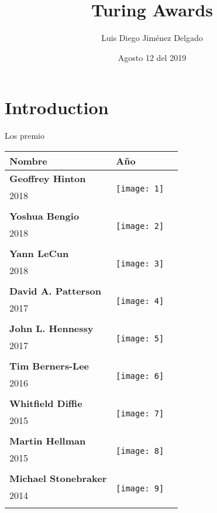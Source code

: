 \documentclass[12pt]{article}
\title{Turing Awards}
\author{Luis Diego Jiménez Delgado}
\date{Agosto 12 del 2019}
\begin{document}

\section{Introduction}
Los premio

\begin{center}
\begin{longtable}{| p{} | p{} | p{20cm}} 
\hline
Nombre & Año \\
\hline
\textbf{Geoffrey Hinton} &  \multirow{3}{4em}{\texttt{[image: 1]}} \\ 
2018&   \\ 
&\\
\hline
\textbf{Yoshua Bengio } &  \multirow{3}{4em}{\texttt{[image: 2]}} \\ 
2018&   \\ 
&\\
\hline
\textbf{Yann LeCun } &  \multirow{3}{4em}{\texttt{[image: 3]}} \\ 
2018&   \\ 
&\\
\hline
\textbf{David A. Patterson } &  \multirow{3}{4em}{\texttt{[image: 4]}} \\ 
2017&   \\ 
&\\
\hline
\textbf{John L. Hennessy } &  \multirow{3}{4em}{\texttt{[image: 5]}} \\ 
2017&   \\ 
&\\
\hline
\textbf{Tim Berners-Lee } &  \multirow{3}{4em}{\texttt{[image: 6]}} \\ 
2016&   \\ 
&\\
\hline
\textbf{Whitfield Diffie } &  \multirow{3}{4em}{\texttt{[image: 7]}} \\ 
2015&   \\ 
&\\
\hline
\textbf{Martin Hellman } &  \multirow{3}{4em}{\texttt{[image: 8]}} \\ 
2015&   \\ 
&\\
\hline
\textbf{Michael Stonebraker}  &  \multirow{3}{4em}{\texttt{[image: 9]}} \\ 
2014&   \\ 
&\\

\end{longtable}
\end{center}
\end{document}
